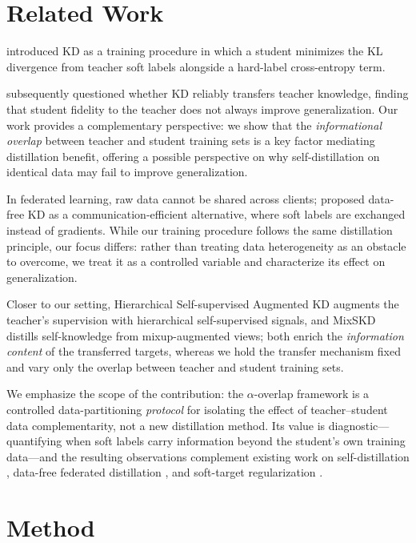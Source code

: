\documentclass[a4paper,fleqn]{cas-dc}
\begin{document}
\section{Related Work}


\citet{hinton2015distillingknowledgeneuralnetwork}
introduced KD as a training procedure in which a student minimizes
the KL divergence from teacher soft labels alongside a hard-label
cross-entropy term.

\citet{stanton2021does}
subsequently questioned whether KD reliably transfers teacher
knowledge, finding that student fidelity to the teacher does not
always improve generalization. Our work provides a complementary
perspective: we show that the \emph{informational overlap} between
teacher and student training sets is a key factor mediating
distillation benefit, offering a possible perspective on why
self-distillation on identical data may fail to improve generalization.


In federated learning, raw data cannot be shared across clients;
\citet{FLzhu} proposed data-free KD as a
communication-efficient alternative, where soft labels are exchanged
instead of gradients. While our training procedure follows the same distillation principle, our focus differs: rather than treating data heterogeneity as an obstacle to overcome, we treat it as a controlled variable and characterize its effect on generalization.

Closer to our setting, Hierarchical Self-supervised Augmented KD
\citep{yang2021hierarchical} augments the teacher's supervision with
hierarchical self-supervised signals, and MixSKD \citep{yang2022mixskd}
distills self-knowledge from mixup-augmented views; both enrich the
\emph{information content} of the transferred targets, whereas we hold the
transfer mechanism fixed and vary only the overlap between teacher and
student training sets.

We emphasize the scope of the contribution: the $\alpha$-overlap framework
is a controlled data-partitioning \emph{protocol} for isolating the effect
of teacher--student data complementarity, not a new distillation method.
Its value is diagnostic---quantifying when soft labels carry information
beyond the student's own training data---and the resulting observations
complement existing work on self-distillation \citep{furlanello2018born},
data-free federated distillation \citep{FLzhu}, and soft-target
regularization \citep{szegedy2016rethinking}.

\section{Method}
\end{document}
